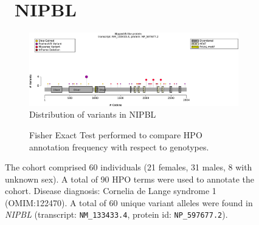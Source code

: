 \begin{figure}[htbp]
\section*{ NIPBL}
\centering
\begin{subfigure}[b]{0.95\textwidth}
\centering
\includegraphics[width=\textwidth]{ img/NIPBL_protein_diagram.pdf} 
\captionsetup{justification=raggedright,singlelinecheck=false}
\caption{Distribution of variants in NIPBL}
\end{subfigure}

\vspace{2em}

\begin{subfigure}[b]{0.95\textwidth}
\centering
{}
\captionsetup{justification=raggedright,singlelinecheck=false}
\caption{Fisher Exact Test performed to compare HPO annotation frequency with respect to genotypes.}
\end{subfigure}

\vspace{2em}

\caption{The cohort comprised 60 individuals (21 females, 31 males, 8 with unknown sex). 
A total of 90 HPO terms were used to annotate the cohort. Disease diagnosis: Cornelia de Lange syndrome 1 (OMIM:122470). 
A total of 60 unique variant alleles were found in \textit{NIPBL} (transcript: \texttt{NM\_133433.4}, protein id: \texttt{NP\_597677.2}).}
\end{figure}
